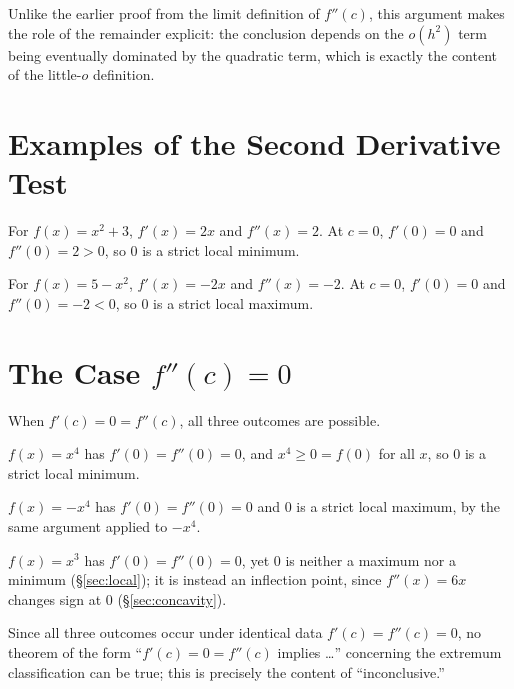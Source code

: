 \documentclass{essay}
\begin{document}
Unlike the earlier proof from the limit definition of \(f''(c)\), this
argument makes the role of the remainder explicit: the conclusion depends
on the \(o(h^{2})\) term being eventually dominated by the quadratic term,
which is exactly the content of the little-\(o\) definition.

\section{Examples of the Second Derivative Test}

\begin{example}
  For \(f(x)=x^{2}+3\), \(f'(x)=2x\) and \(f''(x)=2\). At \(c=0\), \(f'(0)=0\)
  and \(f''(0)=2>0\), so \(0\) is a strict local minimum.
\end{example}

\begin{example}
  For \(f(x)=5-x^{2}\), \(f'(x)=-2x\) and \(f''(x)=-2\). At \(c=0\), \(f'(0)=0\)
  and \(f''(0)=-2<0\), so \(0\) is a strict local maximum.
\end{example}

\section{The Case \texorpdfstring{\(f''(c)=0\)}{f''(c)=0}}
\label{sec:fpp-zero}

When \(f'(c)=0=f''(c)\), all three outcomes are possible.

\begin{example}
  \(f(x)=x^{4}\) has \(f'(0)=f''(0)=0\), and \(x^{4}\geq0=f(0)\) for all \(x\), so
  \(0\) is a strict local minimum.
\end{example}

\begin{example}
  \(f(x)=-x^{4}\) has \(f'(0)=f''(0)=0\) and \(0\) is a strict local maximum, by
  the same argument applied to \(-x^{4}\).
\end{example}

\begin{example}
  \(f(x)=x^{3}\) has \(f'(0)=f''(0)=0\), yet \(0\) is neither a maximum nor a
  minimum (\S\ref{sec:local}); it is instead an inflection point, since \(f''(x)=6x\)
  changes sign at \(0\) (\S\ref{sec:concavity}).
\end{example}

Since all three outcomes occur under identical data \(f'(c)=f''(c)=0\), no
theorem of the form ``\(f'(c)=0=f''(c)\) implies \dots'' concerning the
extremum classification can be true; this is precisely the content of
``inconclusive.''
\end{document}
